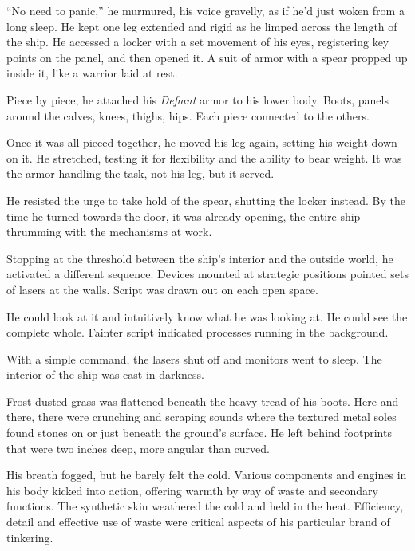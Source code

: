 ``No need to panic,'' he murmured, his voice gravelly, as if he'd just woken from a long sleep.  He kept one leg extended and rigid as he limped across the length of the ship.  He accessed a locker with a set movement of his eyes, registering key points on the panel, and then opened it.  A suit of armor with a spear propped up inside it, like a warrior laid at rest.



Piece by piece, he attached his \emph{Defiant} armor to his lower body.  Boots, panels around the calves, knees, thighs, hips.  Each piece connected to the others.



Once it was all pieced together, he moved his leg again, setting his weight down on it.  He stretched, testing it for flexibility and the ability to bear weight.  It was the armor handling the task, not his leg, but it served.



He resisted the urge to take hold of the spear, shutting the locker instead.  By the time he turned towards the door, it was already opening, the entire ship thrumming with the mechanisms at work.



Stopping at the threshold between the ship's interior and the outside world, he activated a different sequence.  Devices mounted at strategic positions pointed sets of lasers at the walls.  Script was drawn out on each open space.



He could look at it and intuitively know what he was looking at.  He could see the complete whole.  Fainter script indicated processes running in the background.



With a simple command, the lasers shut off and monitors went to sleep.  The interior of the ship was cast in darkness.



Frost-dusted grass was flattened beneath the heavy tread of his boots.  Here and there, there were crunching and scraping sounds where the textured metal soles found stones on or just beneath the ground's surface.  He left behind footprints that were two inches deep, more angular than curved.



His breath fogged, but he barely felt the cold.  Various components and engines in his body kicked into action, offering warmth by way of waste and secondary functions.  The synthetic skin weathered the cold and held in the heat.  Efficiency, detail and effective use of waste were critical aspects of his particular brand of tinkering.



